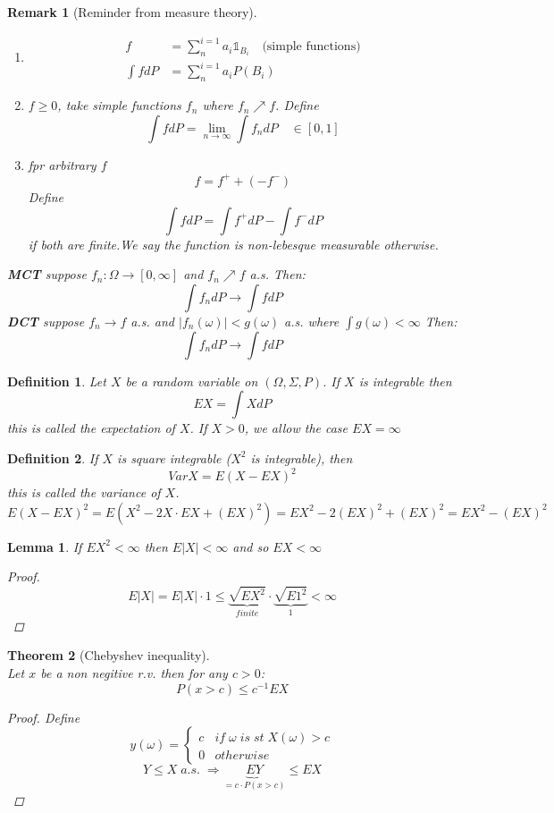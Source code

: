 \documentclass[12pt]{article}
\newtheorem{theorem}{Theorem}[section]
\newtheorem{lemma}[theorem]{Lemma}
\newtheorem{definition}{Definition}[section]
\newtheorem*{remark}{Remark}
\begin{document}
\begin{remark}[Reminder from measure theory]\quad \\
\begin{enumerate}  
\item \begin{align*} f &= \sum_{n}^{i=1}a_i{\mathbb 1}_{B_i} \quad \text{(simple functions)}\\
\int f dP &= \sum_{n}^{i=1}a_iP(B_i) \end{align*}
\item $f \geq 0 $, take simple functions $f_n$ where $f_n \nearrow f$. Define
\[\int f dP = \lim_{n \rightarrow \infty}\int f_n dP \quad \in [0,1]\]
\item fpr arbitrary $f$
\[ f = f^{+}+ ( - f^{-}) \]
Define
\[\int f dP = \int f^{+} dP  - \int f^{-} dP\]
if both are finite.We say the function is non-lebesque measurable otherwise.
\end{enumerate}
\textbf{MCT} suppose $f_n: \Omega \rightarrow [0,\infty]$ and $f_n \nearrow f$ a.s. Then:
\[\int f_n dP \rightarrow \int f dP\]
\textbf{DCT} suppose $f_n \rightarrow f$ a.s. and $|f_n(\omega)| < g(\omega)$ a.s. where $\int g(\omega) < \infty$ Then:
\[\int f_n dP \rightarrow \int f dP\]
\end{remark}

\begin{definition}
Let $X$ be a random variable on $(\Omega , \Sigma , P)$. If $X$ is integrable then \[EX = \int X dP \]
this is called the expectation of $X$. If $X >0$, we allow the case $EX = \infty$
\end{definition}
\begin{definition}
 If $X$ is square integrable ($X^2$ is integrable), then \[VarX =E (X - EX)^2 \]
this is called the variance of $X$. 
\[E (X - EX)^2 = E (X^2 -2X\cdot EX + (EX)^2) = EX^2 -2( EX)^2 + (EX)^2 = EX^2 -( EX)^2\]
\end{definition}

\begin{lemma}If $EX^2< \infty$ then $E|X|<\infty$ and so $EX < \infty$
\begin{proof}
\[E|X| = E|X|\cdot 1 \leq \underbrace{\sqrt{EX^2}}_{finite} \cdot \underbrace{\sqrt{E1^2}}_{1} < \infty\]
\end{proof}
\end{lemma}

\begin{theorem}[Chebyshev inequality] \quad\\
Let $x$ be a non negitive r.v. then for any $c>0$:
\[P(x>c) \leq c^{-1}EX\]
\begin{proof}
Define \[y(\omega) = \begin{cases} c & if \; \omega \;  is \; st \;X(\omega)>c\\
0 & otherwise \end{cases} \]
\[Y\leq X \; a.s.\; \Rightarrow \underbrace{EY}_{ = c\cdot P(x>c)} \leq EX\]
\end{proof}
\end{theorem} 
\end{document}
